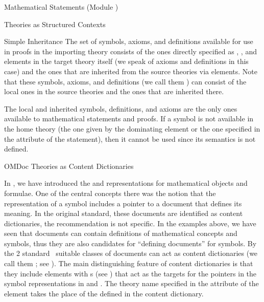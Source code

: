\begin{tchapter}[id=statements,short=Mathematical Statements]{Mathematical Statements (Module {})}
\begin{tsection}[id=theories]{Theories as Structured Contexts}
\begin{tsubsection}[id=inheritance]{Simple Inheritance}
The set of symbols, axioms, and definitions available for use in proofs in the importing
theory consists of the ones directly specified as {}, {},
and {} elements in the target theory itself (we speak of
{} axioms and definitions in this case) and the ones that are inherited from
the source theories via {} elements.  Note that these symbols, axioms,
and definitions (we call them {}) can consist of the local ones in the
source theories and the ones that are inherited there.

The local and inherited symbols, definitions, and axioms are the only ones
available to mathematical statements and proofs. If a symbol is not available in
the home theory (the one given by the dominating {} element or the
one specified in the {} attribute of the statement),
then it cannot be used since its semantics is not defined.
\end{tsubsection}

\begin{tsubsection}[id=identifying]{OMDoc Theories as Content Dictionaries}
  
  In {}, we have introduced the {\openmath} and {\cmathml} representations
  for mathematical objects and formulae. One of the central concepts there was the notion
  that the representation of a symbol includes a pointer to a document that defines its
  meaning. In the original {\openmath} standard, these documents are identified as
  {\openmath} content dictionaries, the {\mathml}
  recommendation is not specific. In the examples above, we have seen that {\omdoc}
  documents can contain definitions of mathematical concepts and symbols, thus they are
  also candidates for ``defining documents'' for symbols.  By the {\openmath}2
  standard~\cite{BusCapCar:2oms04} suitable classes of {\omdoc} documents can act as
  {\openmath} content dictionaries (we call them {}; see
  {}).  The main distinguishing feature of {\omdoc} content
  dictionaries is that they include {} elements with
  {s} (see {}) that act as the targets
  for the pointers in the symbol representations in {\openmath} and {\cmathml}. The theory
  name specified in the {} attribute of the
  {} element takes the place of the {} defined in the
  {\openmath} content dictionary.
  

\end{tsubsection}
\end{tsection}
\end{tchapter}

